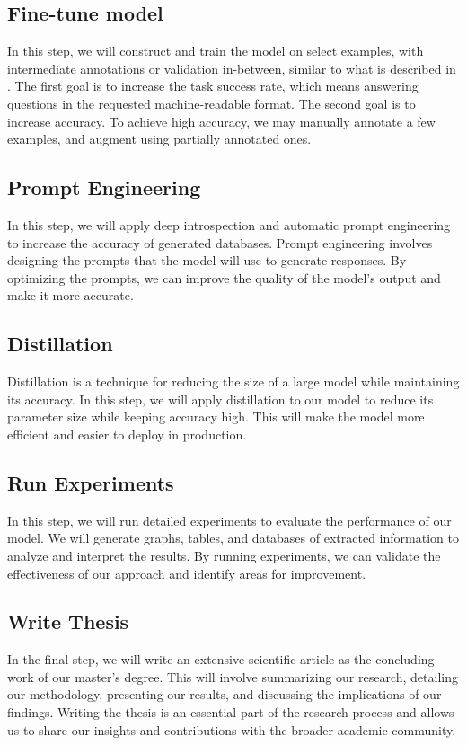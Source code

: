 \documentclass[a4paper,12pt]{article}
\begin{document}
\subsection{Fine-tune model}
In this step, we will construct and train the model on select examples, with
intermediate annotations or validation in-between, similar to what is described
in \cite{dunn_structured_2022}. The first goal is to increase the task success
rate, which means answering questions in the requested machine-readable format.
The second goal is to increase accuracy. To achieve high accuracy, we may
manually annotate a few examples, and augment using partially annotated ones.


\subsection{Prompt Engineering}
In this step, we will apply deep introspection and automatic prompt engineering
\cite{zhou_large_2022} to increase the accuracy of generated databases. Prompt
engineering involves designing the prompts that the model will use to generate
responses. By optimizing the prompts, we can improve the quality of the model's
output and make it more accurate.


\subsection{Distillation}
Distillation is a technique for reducing the size of a large model while
maintaining its accuracy. In this step, we will apply distillation
\cite{sun_patient_2019} to our model to reduce its parameter size while keeping
accuracy high. This will make the model more efficient and easier to deploy in
production.


\subsection{Run Experiments}
In this step, we will run detailed experiments to evaluate the performance of
our model. We will generate graphs, tables, and databases of extracted
information to analyze and interpret the results. By running experiments, we
can validate the effectiveness of our approach and identify areas for
improvement.


\subsection{Write Thesis}
In the final step, we will write an extensive scientific article as the
concluding work of our master's degree. This will involve summarizing our
research, detailing our methodology, presenting our results, and discussing the
implications of our findings. Writing the thesis is an essential part of the
research process and allows us to share our insights and contributions with the
broader academic community.



 
\end{document}

